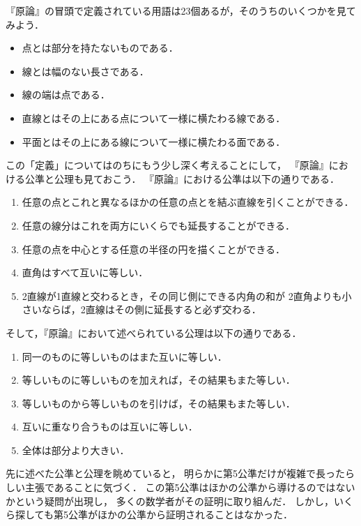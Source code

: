   『原論』の冒頭で定義されている用語は23個あるが，そのうちのいくつかを見てみよう．
  \begin{itemize}
    \item 点とは部分を持たないものである．
    \item 線とは幅のない長さである．
    \item 線の端は点である．
    \item 直線とはその上にある点について一様に横たわる線である．
    \item 平面とはその上にある線について一様に横たわる面である．
  \end{itemize}
  この「定義」についてはのちにもう少し深く考えることにして，
  『原論』における公準と公理も見ておこう．
  『原論』における公準は以下の通りである．
  \begin{enumerate}[公準1.]
    \item 任意の点とこれと異なるほかの任意の点とを結ぶ直線を引くことができる．
    \item 任意の線分はこれを両方にいくらでも延長することができる．
    \item 任意の点を中心とする任意の半径の円を描くことができる．
    \item 直角はすべて互いに等しい．
    \item 2直線が1直線と交わるとき，その同じ側にできる内角の和が
      2直角よりも小さいならば，2直線はその側に延長すると必ず交わる．
  \end{enumerate}
 そして，『原論』において述べられている公理は以下の通りである．
  \begin{enumerate}[公理1.]
    \item 同一のものに等しいものはまた互いに等しい．
    \item 等しいものに等しいものを加えれば，その結果もまた等しい．
    \item 等しいものから等しいものを引けば，その結果もまた等しい．
    \item 互いに重なり合うものは互いに等しい．
    \item 全体は部分より大きい．
  \end{enumerate}


  先に述べた公準と公理を眺めていると，
  明らかに第5公準だけが複雑で長ったらしい主張であることに気づく．
  この第5公準はほかの公準から導けるのではないかという疑問が出現し，
  多くの数学者がその証明に取り組んだ．
  しかし，いくら探しても第5公準がほかの公準から証明されることはなかった．
  
